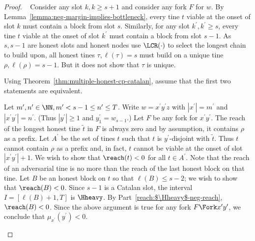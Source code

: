   \begin{proof}
    ~
    Consider any slot $k, k \geq s + 1$ and consider any fork $F$ for $w$.
    By Lemma~\ref{lemma:neg-margin-implies-bottleneck}, 
    every tine $t$ viable at the onset of slot $k$
    must contain a block from slot $s$. 
    Similarly, for any slot $k^\prime, k^\prime \geq s$,
    every tine $t$ viable at the onset of slot $k^\prime$
    must contain a block from slot $s - 1$. 
    As $s, s - 1$ are honest slots and 
    honest nodes use $\LCR(\cdot)$ to select the longest chain to build upon, 
    all honest tines $\tau, \ell(\tau) = s$ 
    must build on a unique tine $\rho, \ell(\rho) = s - 1$.
    {\color{red} But it does not show that $\tau$ is unique.}



    Using Theorem~\ref{thm:multiple-honest-cp-catalan}, 
    assume that the first two statements are equivalent.

    \begin{description}[font=\normalfont\itshape\space]
      \item[Strong-CP implies Part (i) of event $M$.]
      Let $m^\prime, n^\prime \in \NN, m^\prime < s - 1 \leq n^\prime \leq T$.
      Write $w = x^\prime y^\prime z$ with $|x^\prime| = m^\prime$ and $|x^\prime y^\prime| = n^\prime$. 
      (Thus $|y^\prime| \geq 1$ and $y^\prime_1 = w_{s-1}$.)
      Let $F$ be any fork for $x^\prime y^\prime$. 
      The reach of the longest honest tine $\tilde{t}$ in $F$ is always zero 
      and by assumption, it contains $\rho$ as a prefix.
      Let $A^\prime$ be the set of tines $t$ such that 
      $t$ is $y^\prime$-disjoint with $\tilde{t}$. 
      Thus $t$ cannot contain $\rho$ as a prefix and, in fact, 
      $t$ cannot be viable at the onset of slot $|x^\prime y^\prime| + 1$.
      We wish to show that $\reach(t) < 0$ for all $t \in A^\prime$. 
      Note that the reach of an adversarial tine 
      is no more than the reach of the last honest block on that tine. 
      Let $B$ be an honest block on $t$ so that $\ell(B) \leq s - 2$; 
      we wish to show that $\reach(B) < 0$.
      Since $s - 1$ is a Catalan slot, the interval $I = [\ell(B) + 1, T]$ 
      is $\Hheavy$.
      By Part~\ref{reach:$\Hheavy$-neg-reach}, $\reach(B) < 0$.
      Since the above argument is true for any fork $F \Fork x^\prime y^\prime$, 
      we conclude that $\mu_{x^\prime}(y^\prime) < 0$. 



\end{description}
\end{proof}
